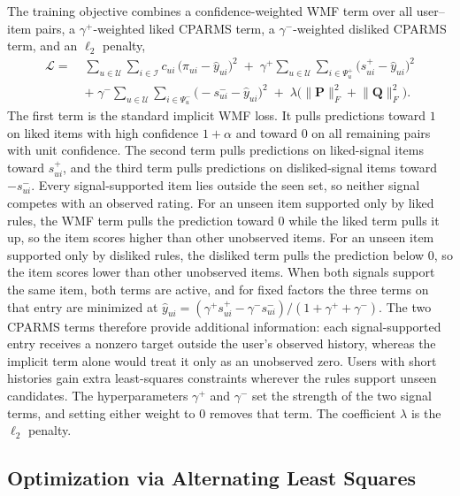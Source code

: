 \documentclass[pdflatex,sn-vancouver-num]{sn-jnl}%
\theoremstyle{thmstyleone}%
\theoremstyle{thmstyletwo}%
\theoremstyle{thmstylethree}%
\begin{document}
The training objective combines a confidence-weighted WMF term over all user--item pairs, a $\gamma^{+}$-weighted liked CPARMS term, a $\gamma^{-}$-weighted disliked CPARMS term, and an $\ell_2$ penalty,
\begin{equation}
\begin{aligned}
\mathcal{L} =\;
& \sum_{u\in\mathcal{U}}\sum_{i\in\mathcal{I}}
c_{ui}\,\big(\pi_{ui} - \hat{y}_{ui}\big)^2
\;+\;
\gamma^{+} \sum_{u\in\mathcal{U}}\sum_{i \in \Psi_u^{+}}
\big(s^{+}_{ui} - \hat{y}_{ui}\big)^2 \\[2pt]
& +\;
\gamma^{-} \sum_{u\in\mathcal{U}}\sum_{i \in \Psi_u^{-}}
\big(-s^{-}_{ui} - \hat{y}_{ui}\big)^2
\;+\; \lambda\Big( \lVert \mathbf{P} \rVert_F^2 + \lVert \mathbf{Q} \rVert_F^2 \Big).
\end{aligned}
\label{eq:objective}
\end{equation}
The first term is the standard implicit WMF loss. It pulls predictions toward $1$ on liked items with high confidence $1+\alpha$ and toward $0$ on all remaining pairs with unit confidence. The second term pulls predictions on liked-signal items toward $s^{+}_{ui}$, and the third term pulls predictions on disliked-signal items toward $-s^{-}_{ui}$. Every signal-supported item lies outside the seen set, so neither signal competes with an observed rating. For an unseen item supported only by liked rules, the WMF term pulls the prediction toward $0$ while the liked term pulls it up, so the item scores higher than other unobserved items. For an unseen item supported only by disliked rules, the disliked term pulls the prediction below $0$, so the item scores lower than other unobserved items. When both signals support the same item, both terms are active, and for fixed factors the three terms on that entry are minimized at $\hat{y}_{ui}=(\gamma^{+}s^{+}_{ui}-\gamma^{-}s^{-}_{ui})/(1+\gamma^{+}+\gamma^{-})$. The two CPARMS terms therefore provide additional information: each signal-supported entry receives a nonzero target outside the user's observed history, whereas the implicit term alone would treat it only as an unobserved zero. Users with short histories gain extra least-squares constraints wherever the rules support unseen candidates. The hyperparameters $\gamma^{+}$ and $\gamma^{-}$ set the strength of the two signal terms, and setting either weight to $0$ removes that term. The coefficient $\lambda$ is the $\ell_2$ penalty.

\FloatBarrier

\subsection{Optimization via Alternating Least Squares}
\end{document}
